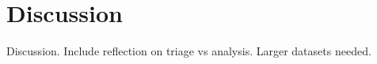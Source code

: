 \section{Discussion}
\label{sec:discussion}

Discussion.
Include reflection on triage vs analysis.
Larger datasets needed.